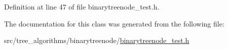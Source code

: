 Definition at line 47 of file binarytreenode\+\_\+test.\+h.



The documentation for this class was generated from the following file\+:\begin{DoxyCompactItemize}
\item 
src/tree\+\_\+algorithms/binarytreenode/\hyperlink{binarytreenode__test_8h}{binarytreenode\+\_\+test.\+h}\end{DoxyCompactItemize}
